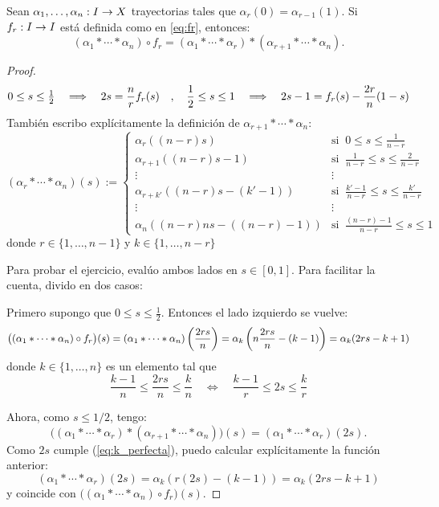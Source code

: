 
\begin{ejercicio}\label{ejercicio:4}
Sean $\alpha_1,\ldots,\alpha_n:I\rightarrow X$ trayectorias tales que $\alpha_r(0)=\alpha_{r-1}(1)$. Si $f_r:I\rightarrow I$
est\'a definida como en \ref{eq:fr}, entonces:
\[
	(\alpha_1*\cdots*\alpha_n)\circ f_r=(\alpha_1*\cdots*\alpha_r)*(\alpha_{r+1}*\cdots*\alpha_n).
\]
\end{ejercicio}
\begin{proof}%
\[
	0\leq s \leq\tfrac{1}{2} \quad\Longrightarrow\quad 2s=\frac{n}{r}f_r(s) \quad,\quad
	\frac{1}{2}\leq s \leq 1 \quad\Longrightarrow\quad 2s-1=f_r(s)-\frac{2r}{n}(1-s)
\]
Tambi\'en escribo expl\'icitamente la definici\'on de $\alpha_{r+1}*\cdots*\alpha_n$:
\[%
	(\alpha_r*\cdots *\alpha_{n})(s):=%
		\begin{cases}%
			\alpha_r((n-r)s) & \text{si}\;\; 0\leq s\leq\frac{1}{n-r} \\
			\alpha_{r+1}((n-r)s-1) & \text{si}\;\;\frac{1}{n-r}\leq s\leq \frac{2}{n-r} \\
			\vdots & \vdots \\
			\alpha_{r+k'}((n-r)s-(k'-1)) & \text{si}\;\;\frac{k'-1}{n-r}\leq s \leq \frac{k'}{n-r} \\
			\vdots & \vdots \\
			\alpha_n((n-r)ns-((n-r)-1)) & \text{si}\;\;\frac{(n-r)-1}{n-r} \leq s \leq 1
		\end{cases}%
\]%
donde $r\in\{1,\ldots,n-1\}$ y $k\in\{1,\ldots,n-r\}$

Para probar el ejercicio, eval\'uo ambos lados en $s\in[0,1]$. Para facilitar la cuenta, divido en dos casos:

Primero supongo que $0\leq s\leq \frac{1}{2}$. Entonces el lado izquierdo se vuelve:
\[
	\big((\alpha_1*\cdots*\alpha_n)\circ f_r\big)(s)=(\alpha_1*\cdots*\alpha_n)\left( \frac{2rs}{n} \right)=
	\alpha_k\left( n\frac{2rs}{n}-(k-1) \right)=\alpha_k(2rs-k+1)
\]
donde $k\in\{1,\ldots,n\}$ es un elemento tal que
\begin{equation}\label{eq:k_perfecta}
	\frac{k-1}{n}\leq \frac{2rs}{n} \leq \frac{k}{n}  \quad\iff\quad  \frac{k-1}{r}\leq 2s \leq \frac{k}{r}
\end{equation}

Ahora, como $s\leq 1/2$, tengo:
\[
\big((\alpha_1*\cdots*\alpha_r)*(\alpha_{r+1}*\cdots*\alpha_n)\big)(s)=(\alpha_1*\cdots*\alpha_r)(2s).
\]
Como $2s$ cumple (\ref{eq:k_perfecta}), puedo calcular expl\'icitamente la funci\'on anterior:
\[
	(\alpha_1*\cdots *\alpha_r)(2s)=\alpha_k(r(2s)-(k-1))=\alpha_k(2rs-k+1)
\]
y coincide con $\big((\alpha_1*\cdots*\alpha_n)\circ f_r\big)(s)$.


\end{proof}
